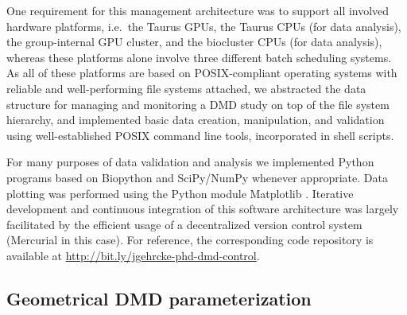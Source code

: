 One requirement for this management architecture was to support all involved
hardware platforms, i.e.\ the Taurus GPUs, the Taurus CPUs (for data analysis),
the group-internal GPU cluster, and the biocluster CPUs (for data analysis),
whereas these platforms alone involve three different batch scheduling systems.
As all of these platforms are based on POSIX-compliant operating systems with
reliable and well-performing file systems attached, we abstracted the data
structure for managing and monitoring a DMD study on top of the file system
hierarchy, and implemented basic data creation, manipulation, and validation
using well-established POSIX command line tools, incorporated in shell scripts.

For many purposes of data validation and analysis we implemented Python
programs based on Biopython \cite{biopython_web} and SciPy/NumPy
\cite{scipy_numpy} whenever appropriate. Data plotting was performed using
the Python module Matplotlib \cite{matplotlib_web}. Iterative development and
continuous integration of this software architecture was largely facilitated by
the efficient usage of a decentralized version control system (Mercurial
\cite{mercurial_web} in this case). For reference, the corresponding code
repository is available at \url{http://bit.ly/jgehrcke-phd-dmd-control}.


\subsection{Geometrical DMD parameterization}


